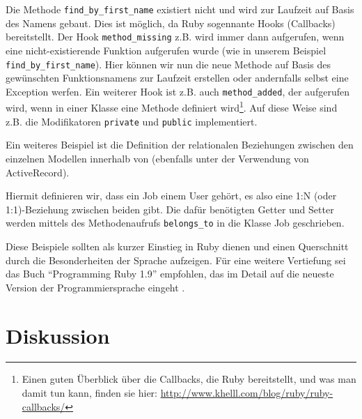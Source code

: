 Die Methode \texttt{find\_by\_first\_name} existiert nicht und wird zur Laufzeit auf Basis des Namens gebaut. Dies ist möglich, da Ruby sogennante Hooks (Callbacks) bereitstellt. Der Hook \texttt{method\_missing} z.B. wird immer dann aufgerufen, wenn eine nicht-existierende Funktion aufgerufen wurde (wie in unserem Beispiel \texttt{find\_by\_first\_name}). Hier können wir nun die neue Methode auf Basis des gewünschten Funktionsnamens zur Laufzeit erstellen oder andernfalls selbst eine Exception werfen. Ein weiterer Hook ist z.B. auch \texttt{method\_added}, der aufgerufen wird, wenn in einer Klasse eine Methode definiert wird\footnote{Einen guten Überblick über die Callbacks, die Ruby bereitstellt, und was man damit tun kann, finden sie hier: \url{http://www.khelll.com/blog/ruby/ruby-callbacks/}}. Auf diese Weise sind z.B. die Modifikatoren \texttt{private} und \texttt{public} implementiert.

Ein weiteres Beispiel ist die Definition der relationalen Beziehungen zwischen den einzelnen Modellen innerhalb von  (ebenfalls unter der Verwendung von ActiveRecord).
\begin{ruby}[label=app/models/job.rb]
   
   
\end{ruby}

Hiermit definieren wir, dass ein Job einem User gehört, es also eine 1:N (oder 1:1)-Beziehung zwischen beiden gibt. Die dafür benötigten Getter und Setter werden mittels des Methodenaufrufs \texttt{belongs\_to} in die Klasse Job geschrieben.

Diese Beispiele sollten als kurzer Einstieg in Ruby dienen und einen Querschnitt durch die Besonderheiten der Sprache aufzeigen.
Für eine weitere Vertiefung sei das Buch "`Programming Ruby 1.9"' empfohlen, das im Detail auf die neueste Version der Programmiersprache eingeht \citep{hunt_programming_2009}.



\section{Diskussion}


